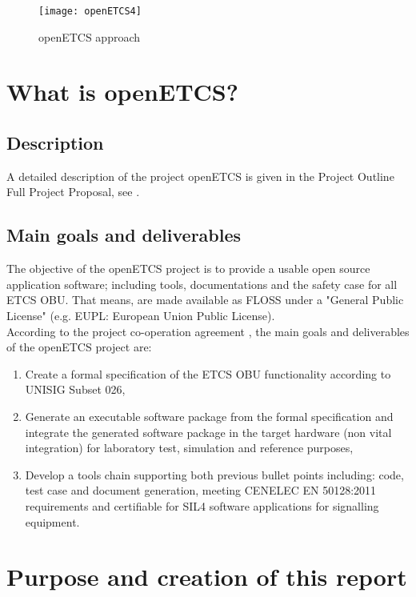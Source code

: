 \documentclass{template/openetcs_report}
\begin{document}
\begin{figure}[h]
\centering
\texttt{[image: openETCS4]}
\caption{openETCS approach}
\label{fig:openETCS4}
\end{figure}


\chapter{What is openETCS?}

\section{Description}
A detailed description of the project openETCS is given in the Project Outline Full Project
Proposal, see \cite{FPP13}.

\section{Main goals and deliverables}
\label{goals}
The objective of the openETCS project is to provide a usable open source application software; including tools, documentations and the safety case for all ETCS OBU. That means, are made available as FLOSS under a "General Public License" (e.g. EUPL: European Union Public License).
\\
According to the project co-operation agreement \cite{PCA12}, the main goals and deliverables of the openETCS project are:
\begin{enumerate}
  \item Create a formal specification of the ETCS OBU functionality according to UNISIG Subset 026,
  \item Generate an executable software package from the formal specification and integrate the generated software package in the target hardware (non vital integration) for laboratory test, simulation and reference purposes,  
  \item Develop a tools chain supporting both previous bullet points including: code, test case and document generation, meeting CENELEC EN 50128:2011 requirements and certifiable for SIL4 software applications for signalling equipment.
\end{enumerate}


\chapter{Purpose and creation of this report}
\end{document}
